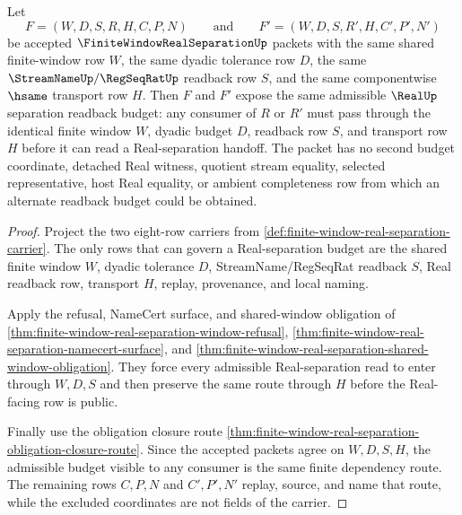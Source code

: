 \begin{theorem}
\label{thm:finite-window-real-separation-window-budget-determinacy}
Let
$$
F=(W,D,S,R,H,C,P,N)
\qquad\text{and}\qquad
F'=(W,D,S,R',H,C',P',N')
$$
be accepted $\FiniteWindowRealSeparationUp$ packets with the same shared finite-window row $W$, the same dyadic tolerance row $D$, the same $\StreamNameUp/\RegSeqRatUp$ readback row $S$, and the same componentwise $\hsame$ transport row $H$. Then $F$ and $F'$ expose the same admissible $\RealUp$ separation readback budget: any consumer of $R$ or $R'$ must pass through the identical finite window $W$, dyadic budget $D$, readback row $S$, and transport row $H$ before it can read a Real-separation handoff. The packet has no second budget coordinate, detached Real witness, quotient stream equality, selected representative, host Real equality, or ambient completeness row from which an alternate readback budget could be obtained.
\end{theorem}
\begin{proof}
Project the two eight-row carriers from \autoref{def:finite-window-real-separation-carrier}. The only rows that can govern a Real-separation budget are the shared finite window $W$, dyadic tolerance $D$, StreamName/RegSeqRat readback $S$, Real readback row, transport $H$, replay, provenance, and local naming.

Apply the refusal, NameCert surface, and shared-window obligation of \autoref{thm:finite-window-real-separation-window-refusal}, \autoref{thm:finite-window-real-separation-namecert-surface}, and \autoref{thm:finite-window-real-separation-shared-window-obligation}. They force every admissible Real-separation read to enter through $W,D,S$ and then preserve the same route through $H$ before the Real-facing row is public.

Finally use the obligation closure route \autoref{thm:finite-window-real-separation-obligation-closure-route}. Since the accepted packets agree on $W,D,S,H$, the admissible budget visible to any consumer is the same finite dependency route. The remaining rows $C,P,N$ and $C',P',N'$ replay, source, and name that route, while the excluded coordinates are not fields of the carrier.
\end{proof}

